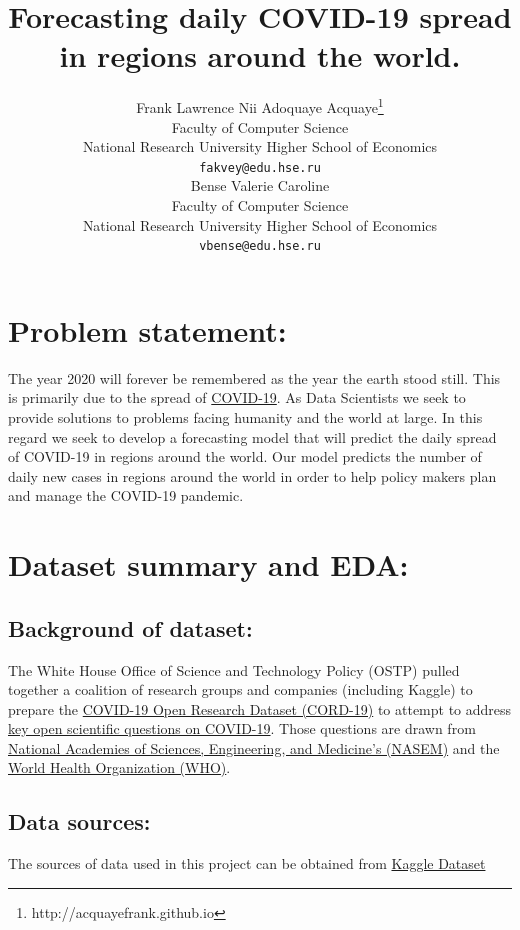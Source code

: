 \documentclass{article}
\title{Forecasting daily COVID-19 spread in regions around the world.}
\author{%
  Frank Lawrence Nii Adoquaye Acquaye\thanks{http://acquayefrank.github.io} \\
  Faculty of Computer Science\\
  National Research University Higher School of Economics\\
  \texttt{fakvey@edu.hse.ru} \\
  \And
  Bense Valerie Caroline \\
  Faculty of Computer Science\\
  National Research University Higher School of Economics\\
   \texttt{vbense@edu.hse.ru} \\
}
\begin{document}
\maketitle

\begin{abstract}

\end{abstract}

\section{Problem statement:}
The year 2020 will forever be remembered as the year the earth stood still. This is  primarily due to the spread of \href{https://en.wikipedia.org/wiki/Coronavirus_disease_2019}{COVID-19}. As Data Scientists we seek to provide solutions to problems facing humanity and the world at large. In this regard we seek to develop a forecasting model that will predict the daily spread of COVID-19 in regions around the world.  Our model predicts the number of daily new cases in regions around the world in order to help policy makers plan and manage the COVID-19 pandemic.  

\section{Dataset summary and EDA:}

\subsection{Background of dataset:}
The White House Office of Science and Technology Policy (OSTP) pulled together a coalition of research groups and companies (including Kaggle) to prepare the \href{https://www.kaggle.com/allen-institute-for-ai/CORD-19-research-challenge}{COVID-19 Open Research Dataset (CORD-19)} to attempt to address \href{https://www.kaggle.com/allen-institute-for-ai/CORD-19-research-challenge/tasks}{key open scientific questions on COVID-19}. Those questions are drawn from \href{https://www.nationalacademies.org/event/03-11-2020/standing-committee-on-emerging-infectious-diseases-and-21st-century-health-threats-virtual-meeting-1}{National Academies of Sciences, Engineering, and Medicine’s (NASEM)} and the \href{https://www.who.int/blueprint/priority-diseases/key-action/Global_Research_Forum_FINAL_VERSION_for_web_14_feb_2020.pdf?ua=1}{World Health Organization (WHO)}.

\subsection{Data sources:}
The sources of data used in this project can be obtained from \href{https://www.kaggle.com/c/covid19-global-forecasting-week-5/overview}{Kaggle Dataset}
\end{document}
